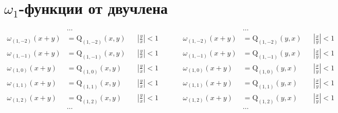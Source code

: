 
\section{$\omega_1$-функции от двучлена}

\begin{equation*} \begin{aligned}
&\ldots &&&&& &\ldots \\
%
\omega_{(1,-2)}(x + y) &= \mathrm{Q}_{(1,-2)}(x, y) &
&\left| \frac{y}{x} \right| < 1 &
&\quad &
\omega_{(1,-2)}(x + y) &= \mathrm{Q}_{(1,-2)}(y, x) & 
&\left| \frac{x}{y} \right| < 1 \\
%
\omega_{(1,-1)}(x + y) &= \mathrm{Q}_{(1,-1)}(x, y) & 
&\left| \frac{y}{x} \right| < 1 &
&\quad &
\omega_{(1,-1)}(x + y) &= \mathrm{Q}_{(1,-1)}(y, x) & 
&\left| \frac{x}{y} \right| < 1 \\
%
\omega_{(1,0)}(x + y) &= \mathrm{Q}_{(1,0)}(x, y) & 
&\left| \frac{y}{x} \right| < 1 &
&\quad &
\omega_{(1,0)}(x + y) &= \mathrm{Q}_{(1,0)}(y, x) & 
&\left| \frac{x}{y} \right| < 1 \\
%
\omega_{(1,1)}(x + y) &= \mathrm{Q}_{(1,1)}(x, y) & 
&\left| \frac{y}{x} \right| < 1 &
&\quad &
\omega_{(1,1)}(x + y) &= \mathrm{Q}_{(1,1)}(y, x) & 
&\left| \frac{x}{y} \right| < 1 \\
%
\omega_{(1,2)}(x + y) &= \mathrm{Q}_{(1,2)}(x, y) & 
&\left| \frac{y}{x} \right| < 1 &
&\quad &
\omega_{(1,2)}(x + y) &= \mathrm{Q}_{(1,2)}(y, x) & 
&\left| \frac{x}{y} \right| < 1 \\
%
&\ldots &&&&& &\ldots \\
\end{aligned} \end{equation*}

